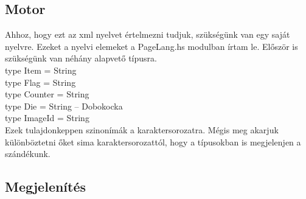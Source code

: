 \documentclass[12pt,a4paper,oneside]{report}
\begin{document}
    \subsection{Motor}
      Ahhoz, hogy ezt az xml nyelvet értelmezni tudjuk, szükségünk van
      egy saját nyelvre. Ezeket a nyelvi elemeket a PageLang.hs
      modulban írtam le.
      Először is szükségünk van néhány alapvető típusra.\\
      {\color{Keyword}type} {\color{Cons}Item} = {\color{Cons}String}\\
      type Flag = String\\
      type Counter = String\\
      type Die = String -- Dobokocka\\
      type ImageId = String\\
      Ezek tulajdonkeppen szinonímák a karaktersorozatra. Mégis meg
      akarjuk különböztetni őket sima karaktersorozattól, hogy a
      típusokban is megjelenjen a szándékunk.

    \subsection{Megjelenítés}
\end{document}
